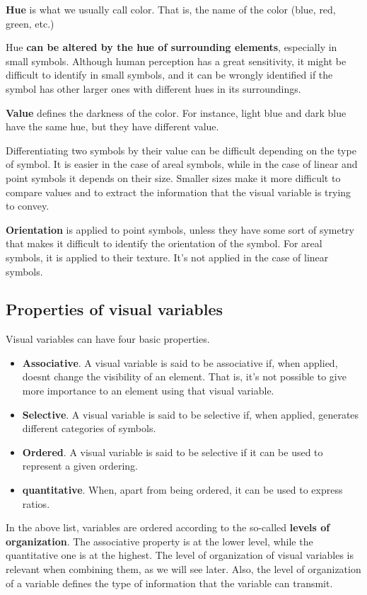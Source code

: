 \textbf{Hue} is what we usually call color. That is, the name of the color (blue, red, green, etc.)

Hue \textbf{can be altered by the hue of surrounding elements}, especially in small symbols. Although human perception has a great sensitivity, it might be difficult to identify in small symbols, and it can be wrongly identified if the symbol has other larger ones with different hues in its surroundings.

\textbf{Value} defines the darkness of the color. For instance, light blue and dark blue have the same hue, but they have different value.

Differentiating two symbols by their value can be difficult depending on the type of symbol. It is easier in the case of areal symbols, while in the case of linear and point symbols it depends on their size. Smaller sizes make it more difficult to compare values and to extract the information that the visual variable is trying to convey.

\textbf{Orientation} is applied to point symbols, unless they have some sort of symetry that makes it difficult to identify the orientation of the symbol. For areal symbols, it is applied to their texture. It's not applied in the case of linear symbols.

\subsection{Properties of visual variables}

Visual variables can have four basic properties.

\begin{itemize}
	\item \textbf{Associative}. A visual variable is said to be associative if, when applied, doesnt change the visibility of an element. That is, it's not possible to give more importance to an element using that visual variable. 
	\item \textbf{Selective}. A visual variable is said to be selective if, when applied, generates different categories of symbols.
	\item \textbf{Ordered}. A visual variable is said to be selective if it can be used to represent a given ordering.
	\item \textbf{quantitative}. When, apart from being ordered, it can be used to express ratios.
\end{itemize}

In the above list, variables are ordered according to the so-called \textbf{levels of organization}. The associative property is at the lower level, while the quantitative one is at the highest. The level of organization of visual variables is relevant when combining them, as we will see later. Also, the level of organization of a variable defines the type of information that the variable can transmit.


